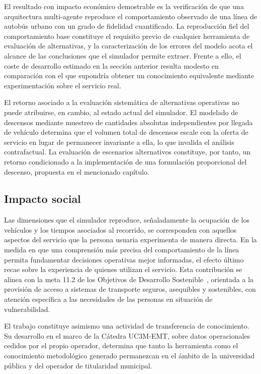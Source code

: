 El resultado con impacto económico demostrable es la verificación de que una arquitectura
multi-agente reproduce el comportamiento observado de una línea de autobús urbano
con un grado de fidelidad cuantificado. La reproducción fiel del comportamiento base
constituye el requisito previo de cualquier herramienta de evaluación de alternativas, y
la caracterización de los errores del modelo acota el alcance de las conclusiones que
el simulador permite extraer. Frente a ello, el coste de desarrollo estimado en la sección
anterior resulta modesto en comparación con el que supondría obtener un conocimiento
equivalente mediante experimentación sobre el servicio real.

El retorno asociado a la evaluación sistemática de alternativas operativas no puede
atribuirse, en cambio, al estado actual del simulador. El modelado de descensos mediante
muestreo de cantidades absolutas independientes por llegada de vehículo determina que el
volumen total de descensos escale con la oferta de servicio en lugar de permanecer
invariante a ella, lo que invalida el análisis contrafactual. La evaluación de escenarios
alternativos constituye, por tanto, un retorno condicionado a la implementación de una
formulación proporcional del descenso, propuesta en el mencionado capítulo.

\subsection{Impacto social}

Las dimensiones que el simulador reproduce, señaladamente la ocupación de los vehículos y
los tiempos asociados al recorrido, se corresponden con aquellos aspectos del servicio que
la persona usuaria experimenta de manera directa. En la medida en que una comprensión más
precisa del comportamiento de la línea permita fundamentar decisiones operativas mejor
informadas, el efecto último recae sobre la experiencia de quienes utilizan el servicio.
Esta contribución se alinea con la meta 11.2 de los Objetivos de Desarrollo
Sostenible~\cite{onu_ods}, orientada a la provisión de acceso a sistemas de transporte
seguros, asequibles y sostenibles, con atención específica a las necesidades de las
personas en situación de vulnerabilidad.

El trabajo constituye asimismo una actividad de transferencia de conocimiento. Su
desarrollo en el marco de la Cátedra UC3M-EMT, sobre datos operacionales cedidos por el
propio operador, determina que tanto la herramienta como el conocimiento metodológico
generado permanezcan en el ámbito de la universidad pública y del operador de titularidad
municipal.

